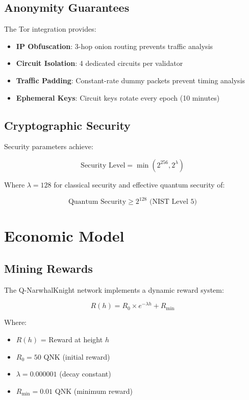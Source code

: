 \documentclass[11pt,a4paper]{article}
\begin{document}
\subsection{Anonymity Guarantees}

The Tor integration provides:

\begin{itemize}
    \item \textbf{IP Obfuscation}: 3-hop onion routing prevents traffic analysis
    \item \textbf{Circuit Isolation}: 4 dedicated circuits per validator
    \item \textbf{Traffic Padding}: Constant-rate dummy packets prevent timing analysis
    \item \textbf{Ephemeral Keys}: Circuit keys rotate every epoch (10 minutes)
\end{itemize}

\subsection{Cryptographic Security}

Security parameters achieve:

\begin{equation}
    \text{Security Level} = \min(2^{256}, 2^{\lambda})
\end{equation}

Where $\lambda = 128$ for classical security and effective quantum security of:

\begin{equation}
    \text{Quantum Security} \geq 2^{128} \text{ (NIST Level 5)}
\end{equation}

\section{Economic Model}

\subsection{Mining Rewards}

The Q-NarwhalKnight network implements a dynamic reward system:

\begin{equation}
    R(h) = R_0 \times e^{-\lambda h} + R_{\min}
\end{equation}

Where:
\begin{itemize}
    \item $R(h)$ = Reward at height $h$
    \item $R_0 = 50$ QNK (initial reward)
    \item $\lambda = 0.000001$ (decay constant)
    \item $R_{\min} = 0.01$ QNK (minimum reward)
\end{itemize}
\end{document}
